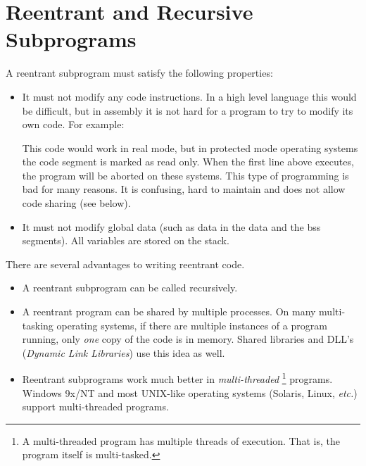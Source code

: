 \section{Reentrant and Recursive Subprograms}

A reentrant subprogram must satisfy the following properties:
\begin{itemize}
\item It must not modify any code instructions. In a high level language
this would be difficult, but in assembly it is not hard for a program to
try to modify its own code. For example:
This code would work in real mode, but in protected mode operating systems 
the code segment is marked as read only. When the first line above executes,
the program will be aborted on these systems. This type of programming is
bad for many reasons. It is confusing, hard to maintain and does not allow
code sharing (see below).

\item It must not modify global data (such as data in the {\code data} and
the {\code bss} segments). All variables are stored on the stack.

\end{itemize}

There are several advantages to writing reentrant code.
\begin{itemize}
\item A reentrant subprogram can be called recursively.
\item A reentrant program can be shared by multiple processes. On many
multi-tasking operating systems, if there are multiple instances of a
program running, only \emph{one} copy of the code is in memory. Shared
libraries and DLL's (\emph{Dynamic Link Libraries}) use this idea as well.
\item Reentrant subprograms work much better in \emph{multi-threaded}
\footnote{A multi-threaded program has multiple threads of execution. That
is, the program itself is multi-tasked.} pro\-grams. Windows 9x/NT and most
UNIX-like operating systems (Solaris, Linux, \emph{etc.}) support 
multi-threaded programs.
\end{itemize}

